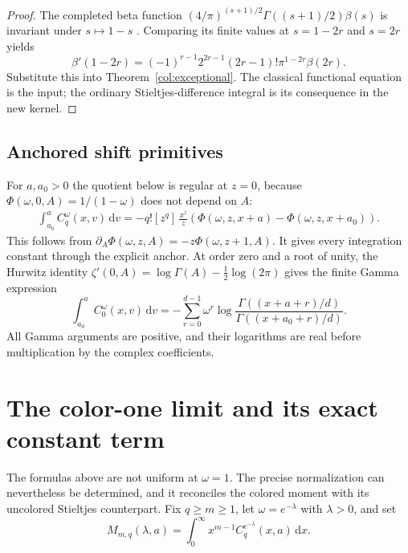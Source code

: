 \documentclass[11pt,a4paper]{article}
\numberwithin{equation}{section}
\theoremstyle{definition}
\theoremstyle{remark}
\newcommand{\dd}{\,\mathrm d}
\begin{document}
\begin{proof}
The completed beta function
$(4/\pi)^{(s+1)/2}\Gamma((s+1)/2)\beta(s)$ is invariant under
$s\mapsto1-s$ \cite{dlmfdirichlet}. Comparing its finite values at
$s=1-2r$ and $s=2r$ yields
\[
 \beta'(1-2r)=
 (-1)^{r-1}2^{2r-1}(2r-1)!\pi^{1-2r}\beta(2r).
\]
Substitute this into Theorem~\ref{col:exceptional}.
The classical functional equation is the input; the ordinary
Stieltjes-difference integral is its consequence in the new kernel.
\end{proof}

\subsection{Anchored shift primitives}

For $a,a_0>0$ the quotient below is regular at $z=0$, because
$\Phi(\omega,0,A)=1/(1-\omega)$ does not depend on $A$:
\begin{equation}\label{col:primitive}
\begin{split}
 \int_{a_0}^a C_q^\omega(x,v)\dd v
  =-q![z^q]\,\frac{x^z}{z}
       \left(\Phi(\omega,z,x+a)-\Phi(\omega,z,x+a_0)\right).
\end{split}
\end{equation}
This follows from
$\partial_A\Phi(\omega,z,A)=-z\Phi(\omega,z+1,A)$.
It gives every integration constant through the explicit anchor.
At order zero and a root of unity, the Hurwitz identity
$\zeta'(0,A)=\log\Gamma(A)-\tfrac12\log(2\pi)$ gives the finite
Gamma expression
\begin{equation}\label{col:gamma-primitive}
 \int_{a_0}^a C_0^\omega(x,v)\dd v
  =-\sum_{r=0}^{d-1}\omega^r
       \log\frac{\Gamma((x+a+r)/d)}
                    {\Gamma((x+a_0+r)/d)}.
\end{equation}
All Gamma arguments are positive, and their logarithms are real
before multiplication by the complex coefficients.

\section{The color-one limit and its exact constant term}
\label{sec:color-limit}

The formulas above are not uniform at $\omega=1$. The precise
normalization can nevertheless be determined, and it reconciles the
colored moment with its uncolored Stieltjes counterpart.
Fix $q\ge m\ge1$, let $\omega=e^{-\lambda}$ with $\lambda>0$, and set
\[
 M_{m,q}(\lambda,a)=\int_0^\infty
                   x^{m-1}C_q^{e^{-\lambda}}(x,a)\dd x.
\]
\end{document}
